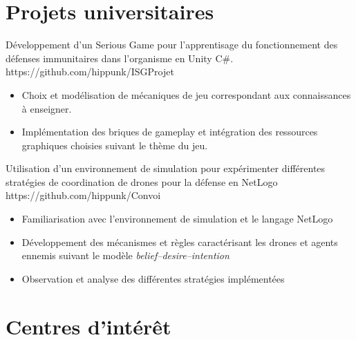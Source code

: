 \documentclass[11pt,a4paper]{moderncv}
\begin{document}
\section{Projets universitaires}

{Développement d'un Serious Game pour l'apprentisage du fonctionnement des défenses immunitaires dans l'organisme en Unity C\#.} { https://github.com/hippunk/ISGProjet}{}{}{
\begin{itemize}
\item Choix et modélisation de mécaniques de jeu correspondant aux connaissances à enseigner.
\item Implémentation des briques de gameplay et intégration des ressources graphiques choisies suivant le thème du jeu.
\end{itemize}
}

{Utilisation d'un environnement de simulation pour expérimenter différentes stratégies de coordination de drones pour la défense en NetLogo }{ https://github.com/hippunk/Convoi}{}{}{
\begin{itemize}
\item Familiarisation avec l'environnement de simulation et le langage NetLogo
\item Développement des mécanismes et règles caractérisant les drones et agents ennemis suivant le modèle \textit{belief–desire–intention}
\item Observation et analyse des différentes stratégies implémentées
\end{itemize}}


\section{Centres d'intérêt}
\end{document}
